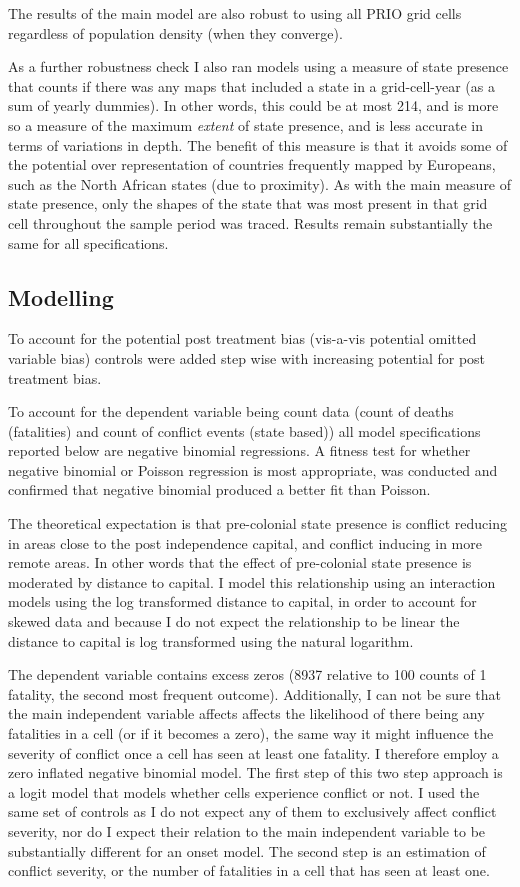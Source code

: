 \documentclass[12pt]{article}
\begin{document}
The results of the main model are also robust to using all PRIO grid cells
regardless of population density (when they converge).

As a further robustness check I also ran models using a measure of state
presence that counts if there was any maps that included a state in a
grid-cell-year (as a sum of yearly dummies). In other words, this could be at
most 214, and is more so a measure of the maximum \textit{extent} of state
presence, and is less accurate in terms of variations in depth. The benefit of
this measure is that it avoids some of the potential over representation of
countries frequently mapped by Europeans, such as the North African states (due
to proximity). As with the main measure of state presence, only the shapes of
the state that was most present in that grid cell throughout the sample period
was traced. Results remain substantially the same for all specifications.

\subsection{Modelling}

To account for the potential post treatment bias (vis-a-vis potential omitted
variable bias) controls were added step wise with increasing potential for post
treatment bias.

To account for the dependent variable being count data (count of deaths
(fatalities) and count of conflict events (state based)) all model
specifications reported below are negative binomial regressions. A fitness test
for whether negative binomial or Poisson regression is most appropriate, was
conducted and confirmed that negative binomial produced a better fit than
Poisson.

The theoretical expectation is that pre-colonial state presence is conflict
reducing in areas close to the post independence capital, and conflict inducing
in more remote areas. In other words that the effect of pre-colonial state
presence is moderated by distance to capital. I model this relationship using an
interaction models using the log transformed distance to capital, in order to
account for skewed data and because I do not expect the relationship to be
linear the distance to capital is log transformed using the natural logarithm.

The dependent variable contains excess zeros (8937 relative to 100 counts of 1
fatality, the second most frequent outcome). Additionally, I can not be sure
that the main independent variable affects affects the likelihood of there being
any fatalities in a cell (or if it becomes a zero), the same way it might
influence the severity of conflict once a cell has seen at least one fatality. I
therefore employ a zero inflated negative binomial model. The first step of this
two step approach is a logit model that models whether cells experience conflict
or not. I used the same set of controls as I do not expect any of them to
exclusively affect conflict severity, nor do I expect their relation to the main
independent variable to be substantially different for an onset model. The
second step is an estimation of conflict severity, or the number of fatalities
in a cell that has seen at least one.
\end{document}
